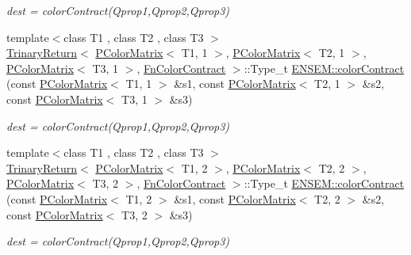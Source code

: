 \begin{DoxyCompactItemize}
\begin{DoxyCompactList}\small\item\em dest = color\+Contract(\+Qprop1,\+Qprop2,\+Qprop3) \end{DoxyCompactList}\item 
{\footnotesize template$<$class T1 , class T2 , class T3 $>$ }\\\mbox{\hyperlink{structENSEM_1_1TrinaryReturn}{Trinary\+Return}}$<$ \mbox{\hyperlink{classENSEM_1_1PColorMatrix}{P\+Color\+Matrix}}$<$ T1, 1 $>$, \mbox{\hyperlink{classENSEM_1_1PColorMatrix}{P\+Color\+Matrix}}$<$ T2, 1 $>$, \mbox{\hyperlink{classENSEM_1_1PColorMatrix}{P\+Color\+Matrix}}$<$ T3, 1 $>$, \mbox{\hyperlink{structENSEM_1_1FnColorContract}{Fn\+Color\+Contract}} $>$\+::Type\+\_\+t \mbox{\hyperlink{group__primcolormatrix_ga89c3eb4b75063bbb9022ef9b699765dd}{E\+N\+S\+E\+M\+::color\+Contract}} (const \mbox{\hyperlink{classENSEM_1_1PColorMatrix}{P\+Color\+Matrix}}$<$ T1, 1 $>$ \&s1, const \mbox{\hyperlink{classENSEM_1_1PColorMatrix}{P\+Color\+Matrix}}$<$ T2, 1 $>$ \&s2, const \mbox{\hyperlink{classENSEM_1_1PColorMatrix}{P\+Color\+Matrix}}$<$ T3, 1 $>$ \&s3)
\begin{DoxyCompactList}\small\item\em dest = color\+Contract(\+Qprop1,\+Qprop2,\+Qprop3) \end{DoxyCompactList}\item 
{\footnotesize template$<$class T1 , class T2 , class T3 $>$ }\\\mbox{\hyperlink{structENSEM_1_1TrinaryReturn}{Trinary\+Return}}$<$ \mbox{\hyperlink{classENSEM_1_1PColorMatrix}{P\+Color\+Matrix}}$<$ T1, 2 $>$, \mbox{\hyperlink{classENSEM_1_1PColorMatrix}{P\+Color\+Matrix}}$<$ T2, 2 $>$, \mbox{\hyperlink{classENSEM_1_1PColorMatrix}{P\+Color\+Matrix}}$<$ T3, 2 $>$, \mbox{\hyperlink{structENSEM_1_1FnColorContract}{Fn\+Color\+Contract}} $>$\+::Type\+\_\+t \mbox{\hyperlink{group__primcolormatrix_gacaff55b3cd1b6aafb43249af3ac16ea9}{E\+N\+S\+E\+M\+::color\+Contract}} (const \mbox{\hyperlink{classENSEM_1_1PColorMatrix}{P\+Color\+Matrix}}$<$ T1, 2 $>$ \&s1, const \mbox{\hyperlink{classENSEM_1_1PColorMatrix}{P\+Color\+Matrix}}$<$ T2, 2 $>$ \&s2, const \mbox{\hyperlink{classENSEM_1_1PColorMatrix}{P\+Color\+Matrix}}$<$ T3, 2 $>$ \&s3)
\begin{DoxyCompactList}\small\item\em dest = color\+Contract(\+Qprop1,\+Qprop2,\+Qprop3) \end{DoxyCompactList}\item 

\end{DoxyCompactItemize}

